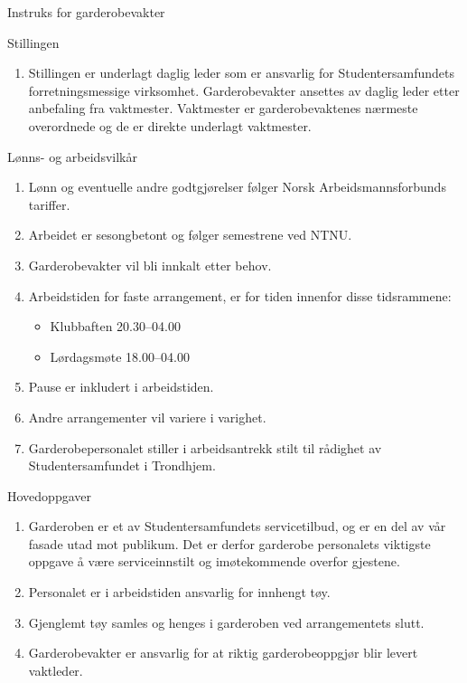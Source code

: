 \documentclass[fsbok.tex]{subfiles}
\begin{document}
\begin{instruks*}{Instruks for garderobevakter}
    
    \begin{instruksledd}{Stillingen}
        \begin{enumerate}
            \item Stillingen er underlagt daglig leder som er ansvarlig for Studentersamfundets forretningsmessige virksomhet.
                Garderobevakter ansettes av daglig leder etter anbefaling fra vaktmester. Vaktmester er garderobevaktenes nærmeste
                overordnede og de er direkte underlagt vaktmester.
        \end{enumerate}    
    \end{instruksledd}

    \begin{instruksledd}{Lønns- og arbeidsvilkår}
        \begin{enumerate}
            \item Lønn og eventuelle andre godtgjørelser følger Norsk Arbeidsmannsforbunds tariffer.
            \item Arbeidet er sesongbetont og følger semestrene ved NTNU.
            \item Garderobevakter vil bli innkalt etter behov.
            \item Arbeidstiden for faste arrangement, er for tiden innenfor disse tidsrammene:
                \begin{itemize}
                    \item Klubbaften 20.30--04.00
                    \item Lørdagsmøte 18.00--04.00
                \end{itemize}
            \item Pause er inkludert i arbeidstiden.
            \item Andre arrangementer vil variere i varighet.
            \item Garderobepersonalet stiller i arbeidsantrekk stilt til rådighet av Studentersamfundet i Trondhjem.
        \end{enumerate}    
    \end{instruksledd}

    \begin{instruksledd}{Hovedoppgaver}
        \begin{enumerate}
            \item Garderoben er et av Studentersamfundets servicetilbud, og er en del av vår fasade 
                utad mot publikum. Det er derfor garderobe personalets viktigste oppgave å være serviceinnstilt og 
                imøtekommende overfor gjestene.
            \item Personalet er i arbeidstiden ansvarlig for innhengt tøy.
            \item Gjenglemt tøy samles og henges i garderoben ved arrangementets slutt.
            \item Garderobevakter er ansvarlig for at riktig garderobeoppgjør blir levert vaktleder.
        \end{enumerate}
    \end{instruksledd}


\end{instruks*}
\end{document}
